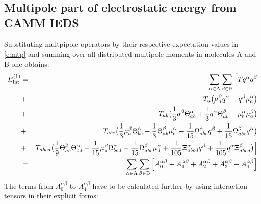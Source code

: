 \documentclass[a4paper,titlepage,twoside,fleqn]{article}
\begin{document}
\subsection{Multipole part of electrostatic energy from CAMM IEDS\label{s:cammint}}

Substituting multpipole operators by their respective 
expectation values in \ref{e:mtp} and summing over all
distributed multipole moments in molecules A and B one 
obtains:
\begin{eqnarray}
E_{\rm int}^{(1)}
&=& \sum_{\alpha \in {\rm A}} \sum_{\beta \in {\rm B}} \Big[  
           {T} {q}^{\alpha} {q}^{\beta} \\ \nonumber
&+& {T}_a \big(
                     {\mu}^{\beta}_a {q}^{\alpha} -
                     {q}^{\beta} {\mu}^{\alpha}_a 
              \big) \\ \nonumber
&+& {T}_{ab} \big( 
                       \frac{1}{3} {q}^{\beta} {\Theta}^{\alpha}_{ab} + 
                       \frac{1}{3} {q}^{\alpha} {\Theta}^{\beta}_{ab} - 
                       {\mu}_b^{\alpha} {\mu}_a^{\beta} 
                 \big)\\ \nonumber
&+& {T}_{abc} \big( \frac{1}{3} {\mu}_a^{\beta} {\Theta}^{\alpha}_{bc} - 
                        \frac{1}{3} {\Theta}^{\beta}_{ab} {\mu}_c^{\alpha} -
                        \frac{1}{15} {\Omega}^{\alpha}_{abc} {q}^{\beta} +
                        \frac{1}{15} {\Omega}^{\beta}_{abc} {q}^{\alpha} 
                   \big)\\ \nonumber
&+& {T}_{abcd} \big( 
                        \frac{1}{9} {\Theta}^{\beta}_{ab} {\Theta}^{\alpha}_{cd} - 
                        \frac{1}{15} {\mu}_a^{\beta} {\Omega}^{\alpha}_{bcd} -
                        \frac{1}{15} {\Omega}^{\beta}_{abc} {\mu}_d^{\alpha} +
                        \frac{1}{105} {\Xi}^{\alpha}_{abcd} {q}^{\beta} + 
                        \frac{1}{105} {q}^{\alpha} {\Xi}^{\beta}_{abcd} 
                   \big)  
 \Big] \\ \nonumber
&=& \sum_{\alpha \in {\rm A}} \sum_{\beta \in {\rm B}} \Big[ 
                                                       {A}^{\alpha\beta}_0 + {A}^{\alpha\beta}_1 + 
                                                       {A}^{\alpha\beta}_2 + {A}^{\alpha\beta}_3 + {A}^{\alpha\beta}_4
                                                       \Big]
\end{eqnarray}
The terms from $A^{\alpha\beta}_0$ to $A^{\alpha\beta}_4$ 
have to be calculated further by using interaction tensors 
in their explicit forms:
\end{document}
